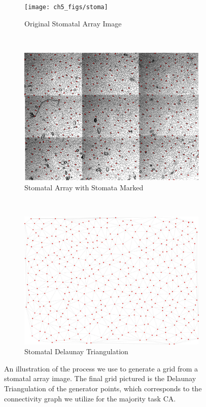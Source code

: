 \documentclass[a4paper,11pt,twoside]{report}
\begin{document}
\begin{figure}[htp]
\centering
  \begin{subfigure}[t]{0.55\textwidth}
  \texttt{[image: ch5\_figs/stoma]}
  \caption{Original Stomatal Array Image}
  \end{subfigure}
  ~
  \begin{subfigure}[t]{0.55\textwidth}
  \centering
  \includegraphics[width=\textwidth]{ch5_figs/stoma-colored}
  \caption{Stomatal Array with Stomata Marked}
  \end{subfigure}
  ~
  \begin{subfigure}[t]{0.55\textwidth}
  \centering
  \includegraphics[width=\textwidth]{ch5_figs/stoma_graph}
  \caption{Stomatal Delaunay Triangulation}
  \end{subfigure}
\caption[Grid Generation from Stomatal Array]{
  An illustration of the process we use to generate a grid from a stomatal array image. The final grid pictured is the Delaunay Triangulation of the generator points, which corresponds to the connectivity graph we utilize for the majority task CA.
  }
\label{fig:stoma_graph_gen}
\end{figure}
\end{document}
